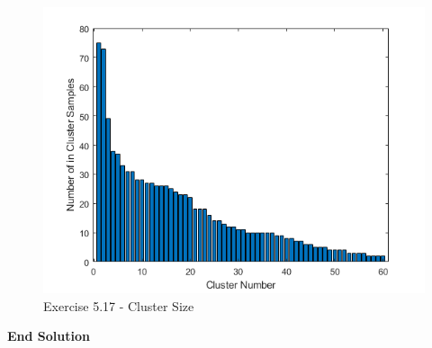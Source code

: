 \documentclass[twoside]{article}
\begin{document}
\begin{figure}[H]
\begin{center}
\includegraphics[width=\textwidth]{./exercise_5_17/ClusterSize.png}
\end{center}
\caption{Exercise 5.17 - Cluster Size}
\end{figure}   
\textbf{End Solution}   
   
  
  
\end{document}
